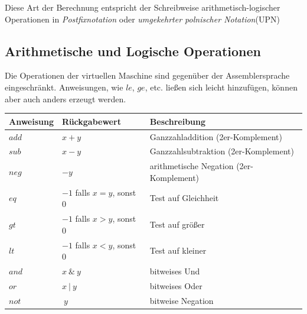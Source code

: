 \documentclass[12pt]{report}
\begin{document}
Diese Art der Berechnung entspricht der Schreibweise arithmetisch-logischer 
Operationen in \textit{Postfixnotation}  oder \textit{umgekehrter polnischer Notation}(UPN)

\subsection{Arithmetische und Logische Operationen}
Die Operationen der virtuellen Maschine sind gegenüber der Assemblersprache eingeschränkt.
Anweisungen, wie $le$, $ge$, etc. ließen sich leicht hinzufügen, können aber auch anders erzeugt werden.
\begin{table}[H]
  \centering
  \begin{tabular}{|l|l|l|}
    \hline
    Anweisung & Rückgabewert                  & Beschreibung                            \\ \hline
    $add$     & $x+y$                         & Ganzzahladdition (2er-Komplement)       \\
    $sub$     & $x-y$                         & Ganzzahlsubtraktion (2er-Komplement)    \\
    $neg$     & $-y$                          & arithmetische Negation (2er-Komplement) \\
    $eq$      & $-1$ falls $x = y$, sonst $0$ & Test auf Gleichheit                     \\
    $gt$      & $-1$ falls $x > y$, sonst $0$ & Test auf größer                         \\
    $lt$      & $-1$ falls $x < y$, sonst $0$ & Test auf kleiner                        \\
    $and$     & $x\ \&\ y$                    & bitweises Und                           \\
    $or$      & $x\ |\ y$                     & bitweises Oder                          \\
    $not$     & $~y$                          & bitweise Negation                       \\ \hline
  \end{tabular}
\end{table}
\end{document}

